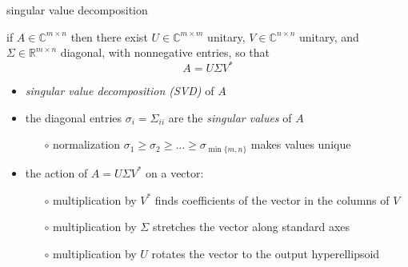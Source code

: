 \documentclass[10pt,hyperref]{beamer}
\newcommand{\CC}{\mathbb{C}}
\newcommand{\RR}{\mathbb{R}}
\begin{document}
\begin{frame}{singular value decomposition}

\begin{theorem}
 if $A\in \CC^{m\times n}$ then there exist $U\in \CC^{m\times m}$ unitary, $V \in \CC^{n\times n}$ unitary, and $\Sigma \in \RR^{m\times n}$ diagonal, with nonnegative entries, so that
    $$A = U \Sigma V^*$$
\end{theorem}

\begin{itemize}
\item \emph{singular value decomposition (SVD)} of $A$
\item the diagonal entries $\sigma_i = \Sigma_{ii}$ are the \emph{singular values} of $A$
    \begin{itemize}
    \item[$\circ$] normalization $\sigma_1\ge \sigma_2 \ge \dots \ge \sigma_{\min\{m,n\}}$ makes values unique
    \end{itemize}
\item the action of $A = U \Sigma V^*$ on a vector:
    \begin{itemize}
    \item[$\circ$] multiplication by $V^*$ finds coefficients of the vector in the columns of $V$
    \item[$\circ$] multiplication by $\Sigma$ stretches the vector along standard axes
    \item[$\circ$] multiplication by $U$ rotates the vector to the output hyperellipsoid
    \end{itemize}
\end{itemize}
\end{frame}
\end{document}
